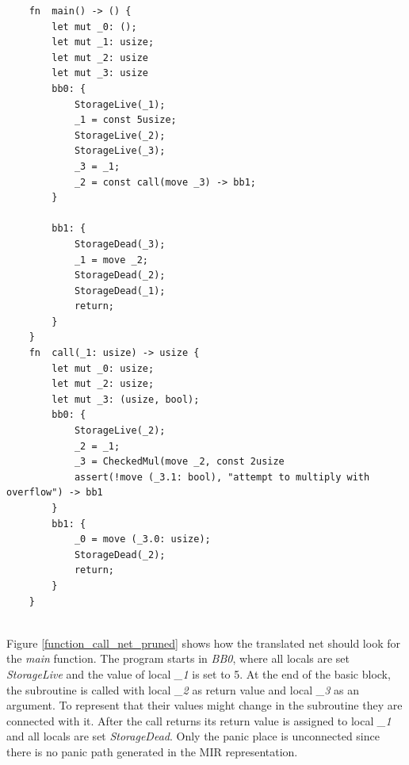 \begin{lstlisting}
    fn  main() -> () {
        let mut _0: ();
        let mut _1: usize;
        let mut _2: usize
        let mut _3: usize
        bb0: {
            StorageLive(_1);
            _1 = const 5usize;
            StorageLive(_2);
            StorageLive(_3);
            _3 = _1;
            _2 = const call(move _3) -> bb1;
        }
    
        bb1: {
            StorageDead(_3);
            _1 = move _2;
            StorageDead(_2);
            StorageDead(_1);
            return;
        }
    }
    fn  call(_1: usize) -> usize {
        let mut _0: usize; 
        let mut _2: usize; 
        let mut _3: (usize, bool); 
        bb0: {
            StorageLive(_2); 
            _2 = _1; 
            _3 = CheckedMul(move _2, const 2usize 
            assert(!move (_3.1: bool), "attempt to multiply with overflow") -> bb1 
        }
        bb1: {
            _0 = move (_3.0: usize); 
            StorageDead(_2); 
            return; 
        }
    }
    
\end{lstlisting}

Figure \ref{function_call_net_pruned} shows how the translated net should look for the \textit{main} function.
The program starts in \textit{BB0}, where all locals are set \textit{StorageLive} and the value of local \textit{\_1} is set to 5.
At the end of the basic block, the subroutine is called with local \textit{\_2} as return value and local \textit{\_3} as an argument.
To represent that their values might change in the subroutine they are connected with it.
After the call returns its return value is assigned to local \textit{\_1} and all locals are set \textit{StorageDead}.
Only the panic place is unconnected since there is no panic path generated in the MIR representation.

